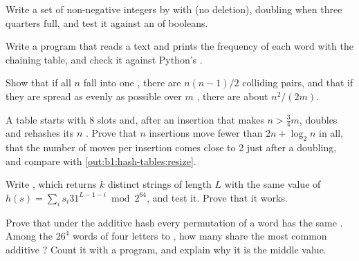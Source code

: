 \begin{exercise}[$\star\star$]\label{exo:b1:hash-tables:7}
Write a set of non-negative integers by  with  (no deletion), doubling when three quarters
full, and test it against an  of booleans.
\end{exercise}

\begin{exercise}[$\star\star$]\label{exo:b1:hash-tables:8}
Write a program that reads a text and prints the frequency of each word with the chaining table, and check it against
Python's .
\end{exercise}

\begin{exercise}[$\star\star$]\label{exo:b1:hash-tables:9}
Show that if all $n$  fall into one , there are $n(n - 1)/2$ colliding pairs, and that if they are spread as
evenly as possible over $m$ , there are about $n^2/(2m)$.
\end{exercise}

\begin{exercise}[$\star\star\star$]\label{exo:b1:hash-tables:10}
A table starts with 8 slots and, after an insertion that makes $n > \frac34 m$, doubles and rehashes its $n$ . Prove
that $n$ insertions move fewer than $2n + \log_2 n$  in all, that the number of moves per insertion comes close to 2
just after a doubling, and compare with \cref{out:b1:hash-tables:resize}.
\end{exercise}

\begin{exercise}[$\star\star\star$]\label{exo:b1:hash-tables:11}
Write , which returns $k$ distinct strings of length $L$ with the same value of $h(s) = \sum_i s_i
31^{L-1-i} \bmod 2^{64}$, and test it. Prove that it works.
\end{exercise}

\begin{exercise}[$\star\star\star$]\label{exo:b1:hash-tables:12}
Prove that under the additive hash every permutation of a word has the same . Among the $26^4$ words of four
letters  to , how many share the most common additive ? Count it with a program, and explain
why it is the middle value.
\end{exercise}


